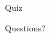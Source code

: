 \documentclass{beamer}
\begin{document}
  \begin{frame}{}
    \begin{center}
      \Large Quiz
    \end{center}
  \end{frame}


  \begin{frame}{}
    \begin{center}
      \Large Questions?
    \end{center}
  \end{frame}
\end{document}
